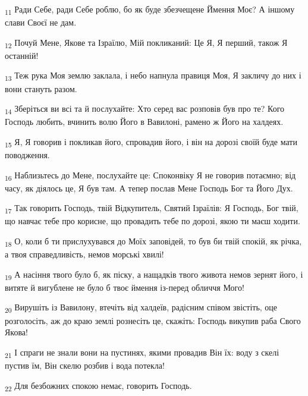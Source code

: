 \begin{tcolorbox}
\textsubscript{11} Ради Себе, ради Себе роблю, бо як буде збезчещене Ймення Моє? А іншому слави Своєї не дам.
\end{tcolorbox}
\begin{tcolorbox}
\textsubscript{12} Почуй Мене, Якове та Ізраїлю, Мій покликаний: Це Я, Я перший, також Я останній!
\end{tcolorbox}
\begin{tcolorbox}
\textsubscript{13} Теж рука Моя землю заклала, і небо напнула правиця Моя, Я закличу до них і вони стануть разом.
\end{tcolorbox}
\begin{tcolorbox}
\textsubscript{14} Зберіться ви всі та й послухайте: Хто серед вас розповів був про те? Кого Господь любить, вчинить волю Його в Вавилоні, рамено ж Його на халдеях.
\end{tcolorbox}
\begin{tcolorbox}
\textsubscript{15} Я, Я говорив і покликав його, спровадив його, і він на дорозі своїй буде мати поводження.
\end{tcolorbox}
\begin{tcolorbox}
\textsubscript{16} Наблизьтесь до Мене, послухайте це: Споконвіку Я не говорив потаємно; від часу, як діялось це, Я був там. А тепер послав Мене Господь Бог та Його Дух.
\end{tcolorbox}
\begin{tcolorbox}
\textsubscript{17} Так говорить Господь, твій Відкупитель, Святий Ізраїлів: Я Господь, Бог твій, що навчає тебе про корисне, що провадить тебе по дорозі, якою ти маєш ходити.
\end{tcolorbox}
\begin{tcolorbox}
\textsubscript{18} О, коли б ти прислухувався до Моїх заповідей, то був би твій спокій, як річка, а твоя справедливість, немов морські хвилі!
\end{tcolorbox}
\begin{tcolorbox}
\textsubscript{19} А насіння твого було б, як піску, а нащадків твого живота немов зернят його, і витяте й вигублене не було б твоє ймення із-перед обличчя Мого!
\end{tcolorbox}
\begin{tcolorbox}
\textsubscript{20} Вирушіть із Вавилону, втечіть від халдеїв, радісним співом звістіть, оце розголосіть, аж до краю землі рознесіть це, скажіть: Господь викупив раба Свого Якова!
\end{tcolorbox}
\begin{tcolorbox}
\textsubscript{21} І спраги не знали вони на пустинях, якими провадив Він їх: воду з скелі пустив їм, Він скелю розбив і вода потекла!
\end{tcolorbox}
\begin{tcolorbox}
\textsubscript{22} Для безбожних спокою немає, говорить Господь.
\end{tcolorbox}
